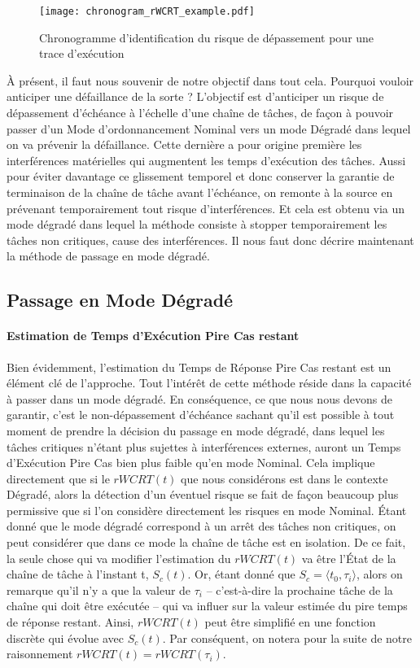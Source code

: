 \documentclass[french, a4paper, 11pt, twoside, pdftex]{StyleThese}
\begin{document}
    \begin{figure}[ht]
		\centering 
		\texttt{[image: chronogram\_rWCRT\_example.pdf]}
		\caption{Chronogramme d'identification du risque de dépassement pour une trace d'exécution}
		\label{fig:chronogram_rWCRT_example}
	\end{figure}

	À présent, il faut nous souvenir de notre objectif dans tout cela. Pourquoi vouloir anticiper une défaillance de la sorte ? L'objectif est d'anticiper un risque de dépassement d'échéance à l'échelle d'une chaîne de tâches, de façon à pouvoir passer d'un Mode d'ordonnancement Nominal vers un mode Dégradé dans lequel on va prévenir la défaillance. Cette dernière a pour origine première les interférences matérielles qui augmentent les temps d'exécution des tâches. Aussi pour éviter davantage ce glissement temporel et donc conserver la garantie de terminaison de la chaîne de tâche avant l'échéance, on remonte à la source en prévenant temporairement tout risque d'interférences. Et cela est obtenu via un mode dégradé dans lequel la méthode consiste à stopper temporairement les tâches non critiques, cause des interférences.
	Il nous faut donc décrire maintenant la méthode de passage en mode dégradé. 
	

    
    \subsection{Passage en Mode Dégradé}
    
        \paragraph{Estimation de Temps d'Exécution Pire Cas restant}
    Bien évidemment, l'estimation du Temps de Réponse Pire Cas restant est un élément clé de l'approche. Tout l'intérêt de cette méthode réside dans la capacité à passer dans un mode dégradé. En conséquence, ce que nous nous devons de garantir, c'est le non-dépassement d'échéance sachant qu'il est possible à tout moment de prendre la décision du passage en mode dégradé, dans lequel les tâches critiques n'étant plus sujettes à interférences externes, auront un Temps d'Exécution Pire Cas bien plus faible qu'en mode Nominal. 
    Cela implique directement que si le $rWCRT(t)$ que nous considérons est dans le contexte Dégradé, alors la détection d'un éventuel risque se fait de façon beaucoup plus permissive que si l'on considère directement les risques en mode Nominal. 
    Étant donné que le mode dégradé correspond à un arrêt des tâches non critiques, on peut considérer que dans ce mode la chaîne de tâche est en isolation. De ce fait, la seule chose qui va modifier l'estimation du $rWCRT(t)$ va être l'État de la chaîne de tâche à l'instant t, $S_c(t)$. Or, étant donné que $S_c = \langle t_0, \tau_i\rangle$, alors on remarque qu'il n'y a que la valeur de $\tau_i$ -- c'est-à-dire la prochaine tâche de la chaîne qui doit être exécutée -- qui va influer sur la valeur estimée du pire temps de réponse restant. Ainsi, $rWCRT(t)$ peut être simplifié en une fonction discrète qui évolue avec $S_c(t)$. Par conséquent, on notera pour la suite de notre raisonnement $rWCRT(t) = rWCRT(\tau_i)$. 
    
\end{document}
